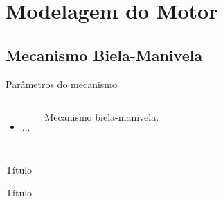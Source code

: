 \section{Modelagem do Motor}

\subsection{Mecanismo Biela-Manivela}

    \begin{frame}{Parâmetros do mecanismo}\vspace*{-2em}
        \begin{columns}
        \begin{itemize}
            \item<1-> ...
        \end{itemize}
        \begin{center}
            \footnotesize Mecanismo biela-manivela.
        \end{center}
        \end{columns}
    \end{frame}

    \begin{frame}{Título}\vspace*{-2em}
    \end{frame}

    \begin{frame}{Título}\vspace*{-2em}
        \begin{columns}
        \end{columns}
    \end{frame}

